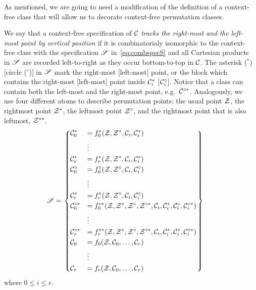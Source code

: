 \documentclass[12pt, a4paper, twoside]{report}
\begin{document}
As mentioned, we are going to need a modification of the definition of a context-free class that will allow us to decorate context-free permutation classes. 
\begin{definition}
  We say that a context-free specification of $\mathcal{C}$ \emph{tracks the right-most and the left-most point by vertical position} if it is combinatorialy isomorphic to the context-free class with the specification $\mathscr{S}$ in~\eqref{eq:combspecS} and all Cartesian products in $\mathscr{S}$ are recorded left-to-right as they occur bottom-to-top in $\mathcal{C}$. The asterisk (${}^*$) [circle (${}^\circ$)] in $\mathscr{S}$ mark the right-most [left-most] point, or the block which contains the right-most [left-most] point inside $\mathcal{C}_i^*$ [$\mathcal{C}_i^\circ$]. Notice that a class can contain both the left-most and the right-most point, e.g.~$\mathcal{C}^{\circ*}$. Analogously, we use four different atoms to describe permutation points: the usual point $\mathcal{Z}$, the rightmost point $\mathcal{Z}^*$, the leftmost point $\mathcal{Z}^\circ$, and the rightmost point that is also leftmost, $\mathcal{Z}^{\circ*}$. 
  \begin{align}
\mathscr{S} &=  \begin{rcases}\begin{dcases}
  \mathcal{C}_0^* &= f_0^*(\mathcal{Z},\mathcal{Z}^*,\mathcal{C}_i, \mathcal{C}_i^*)\\
       &\vdots\\
  \mathcal{C}_r^* &= f_r^*(\mathcal{Z},\mathcal{Z}^*,\mathcal{C}_i, \mathcal{C}_i^*)\\
  \mathcal{C}_0^\circ &= f_0^\circ(\mathcal{Z},\mathcal{Z}^\circ,\mathcal{C}_i,\mathcal{C}_i^\circ)\\
       &\vdots\\
  \mathcal{C}_r^\circ &= f_r^\circ(\mathcal{Z},\mathcal{Z}^\circ,\mathcal{C}_i, \mathcal{C}_i^\circ)\\
  \mathcal{C}_0^{\circ*} &= f_0^{\circ*}(\mathcal{Z},\mathcal{Z}^*,\mathcal{Z}^\circ,\mathcal{Z}^{\circ *}, \mathcal{C}_i, \mathcal{C}_i^*,\mathcal{C}_i^\circ, \mathcal{C}_i^{\circ *})\\
       &\vdots\\
  \mathcal{C}_r^{\circ*} &= f_r^{\circ*}(\mathcal{Z},\mathcal{Z}^*,\mathcal{Z}^\circ,\mathcal{Z}^{\circ *}, \mathcal{C}_i, \mathcal{C}_i^*,\mathcal{C}_i^\circ, \mathcal{C}_i^{\circ *})\\
  \mathcal{C}_0 &= f_0(\mathcal{Z},\mathcal{C}_0,\ldots,\mathcal{C}_r)\\
       &\vdots\\
  \mathcal{C}_r &= f_r(\mathcal{Z},\mathcal{C}_0,\ldots,\mathcal{C}_r)
       \end{dcases}
     \end{rcases}
         \label{eq:combspecS}
  \end{align}
  where $0 \leq i \leq r$. 
 \end{definition}
\end{document}
